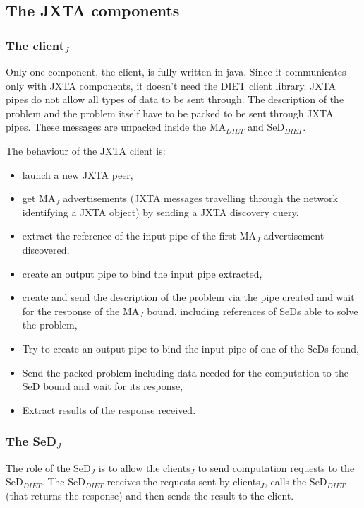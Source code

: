 \subsection{The JXTA components}
\label{ssec:jxtacomponents}

\subsubsection{The client$_{J}$}
\label{sssec:jxtaclient}

Only one component, the client, is fully written in java. Since it
communicates only with JXTA components, it doesn't need the DIET
client library.  JXTA pipes do not allow all types of data to be sent
through. The description of the problem and the problem itself have to
be packed to be sent through JXTA pipes. These messages are unpacked
inside the MA$_{DIET}$ and SeD$_{DIET}$.

The behaviour of the JXTA client is:

\begin {itemize}
\item{launch a new JXTA peer,}
\item{get MA$_{J}$ advertisements (JXTA messages travelling through
    the network identifying a JXTA object) by sending a JXTA discovery
    query,}
\item{extract the reference of the input pipe of the first
    MA$_{J}$ advertisement discovered,}
\item{create an output pipe to bind the input pipe extracted,}
\item{create and send the description of the problem via the pipe
    created and wait for the response of the MA$_{J}$ bound, including
    references of SeDs able to solve the problem,}
\item{Try to create an output pipe to bind the input pipe of one of
    the SeDs found,}
\item{Send the packed problem including data needed for the
    computation to the SeD bound and wait for its response,}
\item{Extract results of the response received.}
\end{itemize}

\subsubsection{The SeD$_{J}$}
\label{sssec:jxtased}

The role of the SeD$_{J}$ is to allow the clients$_{J}$ to send
computation requests to the SeD$_{DIET}$. The SeD$_{DIET}$ receives
the requests sent by clients$_{J}$, calls the SeD$_{DIET}$ (that
returns the response) and then sends the result to the client.

